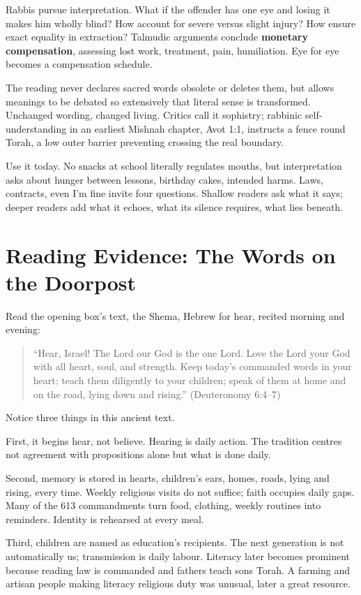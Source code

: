 Rabbis pursue interpretation. What if the offender has one eye and losing it makes him wholly blind? How account for severe versus slight injury? How ensure exact equality in extraction? Talmudic arguments conclude \textbf{monetary compensation}, assessing lost work, treatment, pain, humiliation. Eye for eye becomes a compensation schedule.

The reading never declares sacred words obsolete or deletes them, but allows meanings to be debated so extensively that literal sense is transformed. Unchanged wording, changed living. Critics call it sophistry; rabbinic self-understanding in an earliest Mishnah chapter, Avot 1:1, instructs a fence round Torah, a low outer barrier preventing crossing the real boundary.

Use it today. No snacks at school literally regulates mouths, but interpretation asks about hunger between lessons, birthday cakes, intended harms. Laws, contracts, even I'm fine invite four questions. Shallow readers ask what it says; deeper readers add what it echoes, what its silence requires, what lies beneath.

\section[Reading the Words on the Doorpost]{Reading Evidence: The Words on the Doorpost}
Read the opening box's text, the Shema, Hebrew for hear, recited morning and evening:

\begin{quote}
``Hear, Israel! The Lord our God is the one Lord. Love the Lord your God with all heart, soul, and strength. Keep today's commanded words in your heart; teach them diligently to your children; speak of them at home and on the road, lying down and rising.'' (Deuteronomy 6:4--7)
\end{quote}
Notice three things in this ancient text.

First, it begins hear, not believe. Hearing is daily action. The tradition centres not agreement with propositions alone but what is done daily.

Second, memory is stored in hearts, children's ears, homes, roads, lying and rising, every time. Weekly religious visits do not suffice; faith occupies daily gaps. Many of the 613 commandments turn food, clothing, weekly routines into reminders. Identity is rehearsed at every meal.

Third, children are named as education's recipients. The next generation is not automatically us; transmission is daily labour. Literacy later becomes prominent because reading law is commanded and fathers teach sons Torah. A farming and artisan people making literacy religious duty was unusual, later a great resource.

